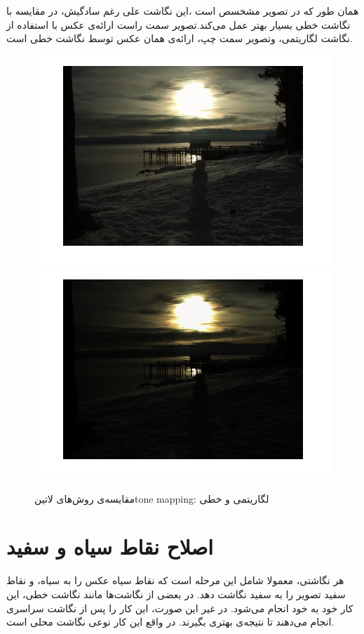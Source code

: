 همان طور که در تصویر مشخسص است ،این نگاشت علی رغم سادگیش، در مقایسه با نگاشت خطی بسیار بهتر عمل  می‌کند.تصویر سمت راست ارائه‌ی عکس با استفاده از نگاشت لگاریتمی، وتصویر سمت چپ، ارائه‌ی همان عکس توسط نگاشت خطی است.
\begin{figure}[!htb]
	\includegraphics[width=\linewidth]{images/logtonemap}
	\endminipage\hfill
	\includegraphics[width=\linewidth]{images/lineartonemap}
	\endminipage\hfill

	\caption{مقایسه‌ی روش‌های
		‌لاتین{tone mapping}: لگاریتمی و خطی
		}\label{fig:linear_vs_log}
\end{figure}

\section{اصلاح نقاط سیاه و سفید}
هر نگاشتی، معمولا شامل این مرحله است که نقاط سیاه عکس را به سیاه، و نقاط سفید تصویر را به سفید نگاشت دهد. در بعضی از نگاشت‌ها مانند نگاشت خطی، این کار خود به خود انجام می‌شود. در غیر این صورت، این کار را پس از نگاشت سراسری انجام می‌دهند تا نتیجه‌ی بهتری بگیرند. در واقع این کار نوعی نگاشت محلی است.

